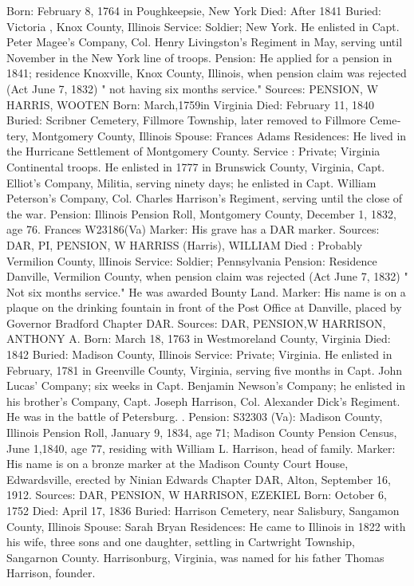 Born: February 8, 1764 in Poughkeepsie, New York 
Died: After 1841 
Buried: Victoria , Knox County, Illinois 
Service: Soldier; New York. He enlisted in Capt. Peter Magee's Company, Col. Henry Livingston's Regiment in May, serving until November in the New York line of troops. 
Pension: He applied for a pension in 1841; residence Knoxville, Knox County, Illinois, when pension claim was rejected (Act June 7, 1832) " not having six months service." 
Sources: PENSION, W 
HARRIS, WOOTEN 
Born: March,1759in Virginia 
Died: February 11, 1840 
Buried: Scribner Cemetery, Fillmore Township, later removed to Fillmore Ceme­tery, Montgomery County, Illinois Spouse: Frances Adams Residences: He lived in the Hurricane Settlement of Montgomery County. 
Service : Private; Virginia Continental troops. He enlisted in 1777 in Brunswick County, Virginia, Capt. Elliot's Company, Militia, serving ninety days; he enlisted in Capt. William Peterson's Company, Col. Charles Harrison's Regi­ment, serving until the close of the war. 
Pension: Illinois Pension Roll, Montgomery County, December 1, 1832, age 76. Frances W23186(Va) 
Marker: His grave has a DAR marker. 
Sources: DAR, PI, PENSION, W 
HARRISS (Harris), WILLIAM
 Died : Probably Vermilion County, llIinois 
Service: Soldier; Pennsylvania 
Pension: Residence Danville, Vermilion County, when pension claim was rejected (Act June 7, 1832) " Not six months service." He was awarded Bounty Land. 
Marker: His name is on a plaque on the drinking fountain in front of the Post Office at Danville, placed by Governor Bradford Chapter DAR. 
Sources: DAR, PENSION,W 
HARRISON, ANTHONY A. 
Born: March 18, 1763 in Westmoreland County, Virginia 
Died: 1842 
Buried: Madison County, Illinois 
Service: Private; Virginia. He enlisted in February, 1781 in Greenville County, Virginia, serving five months in Capt. John Lucas' Company; six weeks in Capt. Benjamin Newson's Company; he enlisted in his brother's Company, Capt. Joseph Harrison, Col. Alexander Dick's Regiment. He was in the battle of Petersburg. . 
Pension: S32303 (Va): Madison County, Illinois Pension Roll, January 9, 1834, age 71; Madison County Pension Census, June 1,1840, age 77, residing with William L. Harrison, head of family. 
Marker: His name is on a bronze marker at the Madison County Court House, Edwardsville, erected by Ninian Edwards Chapter DAR, Alton, September 16, 1912. 
Sources: DAR, PENSION, W 
HARRISON, EZEKIEL 
Born: October 6, 1752 
Died: April 17, 1836 Buried: Harrison Cemetery, near Salisbury, Sangamon County, Illinois 
Spouse: Sarah Bryan 
Residences: He came to Illinois in 1822 with his wife, three sons and one daughter, settling in Cartwright Township, Sangarnon County. Harrison­burg, Virginia, was named for his father Thomas Harrison, founder. 
